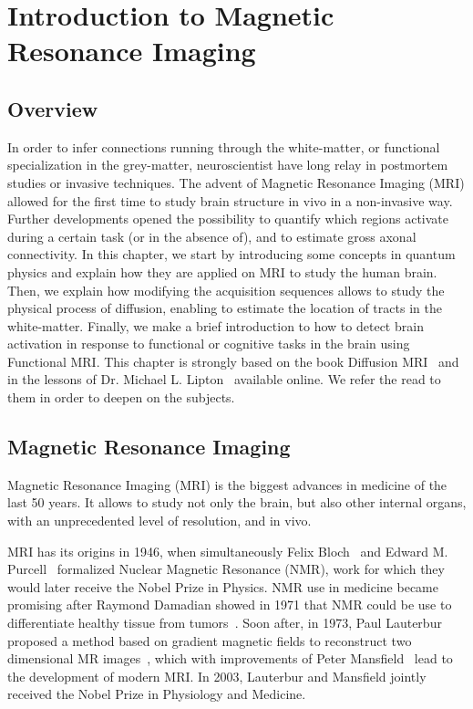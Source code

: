\chapter{Introduction to Magnetic Resonance Imaging}
\label{ch:intro_mri}


\section{Overview}
In order to infer connections running through the white-matter, or functional
specialization in the grey-matter, neuroscientist have long relay in postmortem
studies or invasive techniques. The advent of Magnetic Resonance Imaging (MRI)
allowed for the first time to study brain structure in vivo in a non-invasive
way. Further developments opened the possibility to quantify which regions
activate during a certain task (or in the absence of), and to estimate gross
axonal connectivity. In this chapter, we start by
introducing some concepts in quantum physics and explain how they are
applied on MRI to study the human brain. Then, we explain how modifying the
acquisition sequences allows to study the physical process of diffusion,
enabling to estimate the location of tracts in the white-matter. Finally, we
make a brief introduction to how to detect brain activation in response to
functional or cognitive tasks in the brain using Functional MRI. This chapter
is strongly based on the book Diffusion MRI~ \cite{Basser2009} and in the 
lessons of Dr. Michael L. Lipton~\cite{Lipton2014} available online. We refer
the read to them in order to deepen on the subjects.

\section{Magnetic Resonance Imaging}

Magnetic Resonance Imaging (MRI) is the biggest advances in medicine of the
last 50 years. It allows to study not only the brain, but also other internal
organs, with an unprecedented level of resolution, and in vivo. 

MRI has its origins in 1946, when simultaneously Felix
Bloch~\cite{Bloch1946} and Edward M. Purcell~\cite{Purcell1946} formalized
Nuclear Magnetic Resonance (NMR), work for which they would later receive the
Nobel Prize in Physics. NMR use in medicine became promising after
Raymond Damadian showed in 1971 that NMR could be use to differentiate healthy
tissue from tumors~\cite{Reichson1971}. Soon after, in 1973, Paul Lauterbur 
proposed a method based on gradient magnetic fields to reconstruct two dimensional
MR images~\cite{Lauterbur1973}, which with improvements of Peter
Mansfield~\cite{Mansfield1977} lead to the development of modern MRI. In 2003,
Lauterbur and Mansfield jointly received the Nobel Prize in Physiology and
Medicine. 

